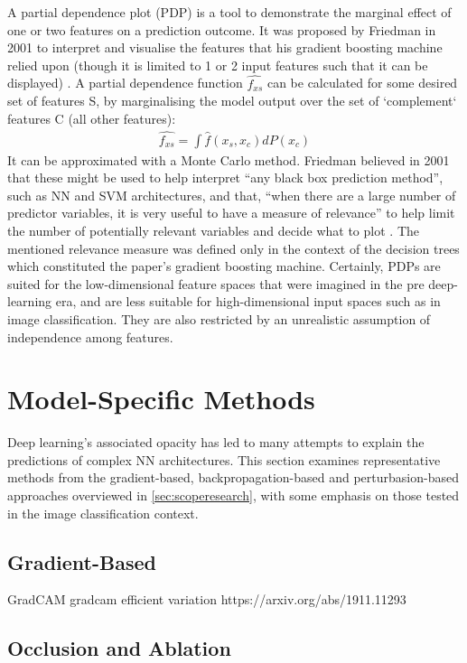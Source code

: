 \documentclass[main]{subfiles}
\begin{document}
A partial dependence plot (PDP) is a tool to demonstrate the marginal effect of one or two features on a prediction outcome. It was proposed by Friedman in 2001 to interpret and visualise the features that his gradient boosting machine relied upon (though it is limited to 1 or 2 input features such that it can be displayed) \cite{pdp1}. A partial dependence function $\widehat{f_{xs}}$ can be calculated for some desired set of features S, by marginalising the model output over the set of `complement` features C (all other features):
\begin{align}
\widehat{f_{xs}}=\int \widehat{f}(x_{s}, x_{c})dP(x_{c})
\end{align}
It can be approximated with a Monte Carlo method. Friedman believed in 2001 that these might be used to help interpret ``any black box prediction method'', such as NN and SVM architectures, and that, ``when there are a large number of predictor variables, it is very useful to have a measure of relevance'' to help limit the number of potentially relevant variables and decide what to plot \cite{pdp1}. The mentioned relevance measure was defined only in the context of the decision trees which constituted the paper's gradient boosting machine. Certainly, PDPs are suited for the low-dimensional feature spaces that were imagined in the pre deep-learning era, and are less suitable for high-dimensional input spaces such as in image classification. They are also restricted by an unrealistic assumption of independence among features.

\section{Model-Specific Methods}
Deep learning's associated opacity has led to many attempts to explain the predictions of complex NN architectures. This section examines representative methods from the gradient-based, backpropagation-based and perturbasion-based approaches overviewed in \ref{sec:scoperesearch}, with some emphasis on those tested in the image classification context.

\subsection{Gradient-Based}

GradCAM
gradcam efficient variation https://arxiv.org/abs/1911.11293
\subsection{Occlusion and Ablation}
\end{document}
